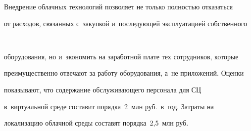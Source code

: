   

  Внедрение облачных технологий позволяет не только полностью отказаться 

от расходов, связанных с~закупкой и~последующей эксплуатацией собственного\linebreak\vspace*{-12pt}



\pagebreak



\



\vspace*{-12pt}








\noindent

оборудования, но и~экономить на заработной плате тех сотрудников, которые 

преимущественно отвечают за работу оборудования, а~не приложений. Оценки 

показывают, что содержание обслуживающего персонала для СЦ 

в~виртуальной среде составит порядка~2~млн руб.\ в~год. Затраты на 

локализацию облачной среды составят порядка~2,5~млн руб. 

